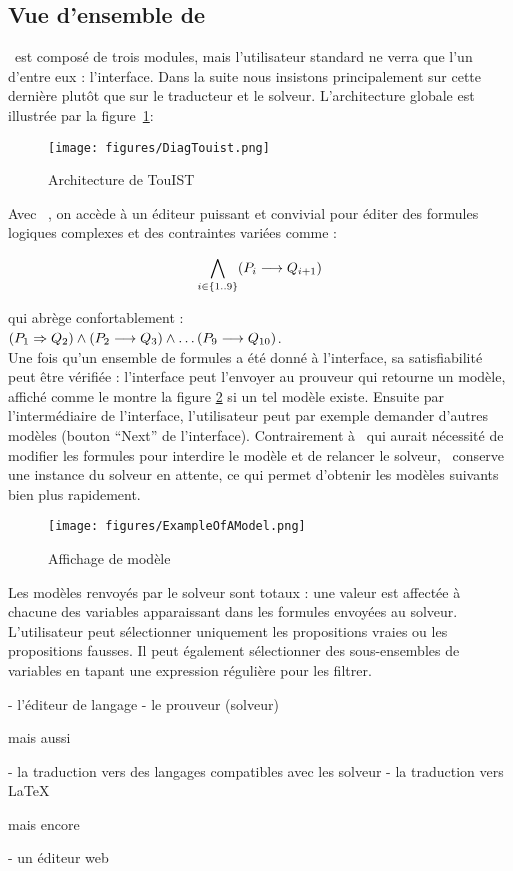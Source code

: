 \subsection{Vue d'ensemble de \touist}\label{sec:sat_interface}


\touist\ est composé de trois modules, mais l'utilisateur standard ne verra que l'un d'entre eux : l'interface. Dans la suite nous insistons principalement sur cette dernière plutôt que sur le traducteur et le solveur. L'architecture globale est illustrée par la figure~\ref{fig:architectureTouisT}: 

\begin{figure}[htbp]
\centering
\texttt{[image: figures/DiagTouist.png]}
  \caption{Architecture de TouIST}
  \label{fig:architectureTouisT}
\end{figure}

Avec \touist\ , on accède à un éditeur puissant et convivial pour éditer des formules logiques complexes et des contraintes variées comme :

$$\bigwedge_{i \in \{1..9\}} (P_i \longrightarrow Q_{i+1})$$

qui abrège confortablement :\\ 

$(P_1 \Rightarrow Q_2) \wedge (P_2 \longrightarrow Q_3) \wedge \ldots (P_9\longrightarrow Q_{10})$. 
\\

Une fois qu'un ensemble de formules a été donné à l'interface, sa satisfiabilité peut être vérifiée : l'interface peut l'envoyer au prouveur qui retourne un modèle, affiché comme le montre la figure \ref{fig:ExampleOfAModel} si un tel modèle existe. Ensuite par l'intermédiaire de l'interface, l'utilisateur peut par exemple demander d'autres modèles (bouton ``Next'' de l'interface). Contrairement à \satoulouse\ qui aurait nécessité de modifier les formules pour interdire le modèle et de relancer le solveur, \touist\ conserve une instance du solveur en attente, ce qui permet d'obtenir les modèles suivants bien plus rapidement.

\begin{figure}[htbp]
\centering
\texttt{[image: figures/ExampleOfAModel.png]}
  \caption{Affichage de modèle}
  \label{fig:ExampleOfAModel}
\end{figure}

Les modèles renvoyés par le solveur sont totaux : une valeur est affectée à chacune des variables apparaissant dans les formules envoyées au solveur. L'utilisateur peut sélectionner uniquement les propositions vraies ou les propositions fausses. Il peut également sélectionner des sous-ensembles de variables en tapant une expression régulière pour les filtrer.









- l'éditeur de langage \touist
- le prouveur (solveur)

mais aussi

- la traduction vers des langages compatibles avec les solveur
- la traduction vers \LaTeX

mais encore

- un éditeur web

